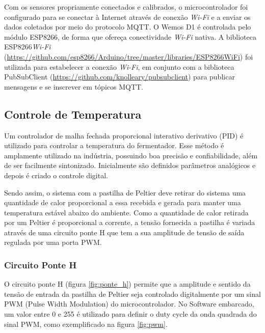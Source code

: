 Com os sensores propriamente conectados e calibrados, o microcontrolador foi configurado para se conectar à Internet através de conexão \textit{Wi-Fi} e a enviar os dados coletados por meio do protocolo MQTT. O Wemos D1 é controlada pelo módulo ESP8266, de forma que ofereça conectividade \textit{Wi-Fi} nativa. 
A biblioteca ESP8266\textit{Wi-Fi} (\url{https://github.com/esp8266/Arduino/tree/master/libraries/ESP8266WiFi}) foi utilizada para estabelecer a conexão \textit{Wi-Fi}, em conjunto com a biblioteca PubSubClient (\url{https://github.com/knolleary/pubsubclient}) para publicar mensagens e se inscrever em tópicos MQTT. 




\subsection{Controle de Temperatura}

Um controlador de malha fechada proporcional interativo derivativo (PID) é utilizado para controlar a temperatura do fermentador. Esse método é amplamente utilizado na indústria, possuindo boa precisão e confiabilidade, além de ser facilmente sintonizado. Inicialmente são definidos parâmetros analógicos e depois é criado o controle digital.


Sendo assim, o sistema com a pastilha de Peltier deve retirar do sistema uma quantidade de calor proporcional a essa recebida e gerada para manter uma temperatura estável abaixo do ambiente. Como a quantidade de calor retirada por um Peltier é proporcional a corrente, a tensão fornecida a pastilha é variada através de uma circuito ponte H que tem a sua amplitude de tensão de saída regulada por uma porta PWM.  

\subsubsection{Circuito Ponte H}

O circuito ponte H (figura \ref{fig:ponte_h}) permite que a amplitude e sentido da tensão de entrada da pastilha de Peltier seja controlado digitalmente por um sinal PWM (Pulse Width Modulation) do microcontrolador. No Software embarcado, um valor entre 0 e 255 é utilizado para definir o duty cycle da onda quadrada do sinal PWM, como exemplificado na figura \ref{fig:pwm}. 


